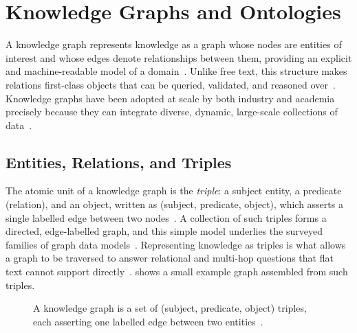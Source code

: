 \section{Knowledge Graphs and Ontologies}
\label{sec:gr-kg-ontologies}

A knowledge graph represents knowledge as a graph whose nodes are entities of
interest and whose edges denote relationships between them, providing an explicit
and machine-readable model of a domain~\cite{hogan2021kg}. Unlike free text,
this structure makes relations first-class objects that can be queried,
validated, and reasoned over~\cite{hogan2021kg, ji2021kgsurvey}. Knowledge graphs
have been adopted at scale by both industry and academia precisely because they
can integrate diverse, dynamic, large-scale collections of
data~\cite{hogan2021kg}.

\subsection{Entities, Relations, and Triples}

The atomic unit of a knowledge graph is the \emph{triple}: a subject entity, a
predicate (relation), and an object, written as (subject, predicate, object),
which asserts a single labelled edge between two nodes~\cite{hogan2021kg}. A
collection of such triples forms a directed, edge-labelled graph, and this simple
model underlies the surveyed families of graph data
models~\cite{hogan2021kg, angles2008graphdb}. Representing knowledge as triples
is what allows a graph to be traversed to answer relational and multi-hop
questions that flat text cannot support directly~\cite{ji2021kgsurvey}.
 shows a small example graph assembled from such triples.

\begin{figure}[htbp]
  \centering
  \caption[An example knowledge graph of triples]{A knowledge graph is a set of (subject, predicate, object) triples,
    each asserting one labelled edge between two entities~\cite{hogan2021kg}.}
  \label{fig:gr-kg-triples}
\end{figure}

